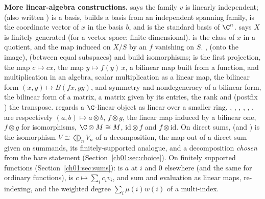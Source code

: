 \textbf{More linear-algebra constructions.}  says the family $v$ is
linearly independent;  (also written ) is a basis,  builds a basis from an independent spanning family,
 is the coordinate vector of $x$ in the basis $b$, and  is the
standard basis of $\C^n$.  says $X$ is finitely generated (for a vector space:
finite-dimensional).  is the class of $x$ in a quotient, and
 the map induced on $X/S$ by an $f$ vanishing on $S$. ,
 (onto the image),  (between equal subspaces) and
build isomorphisms;  is the first projection, 
the map $c\mapsto cx$,  the map $y\mapsto f(y)\,x$, 
a bilinear map built from a function,  and  multiplication
in an algebra,  scalar multiplication as a linear map,  the
bilinear form $(x,y)\mapsto B(fx,gy)$,  and  symmetry and
nondegeneracy of a bilinear form,  the bilinear form of a matrix,
 a matrix given by its entries,  the rank and  (postfix ) the transpose.
 regards a $\C$-linear object as linear over a smaller ring. ,
, , , ,
,  are
respectively $(a,b)\mapsto a\otimes b$, $f\otimes g$, the linear map induced by a bilinear one,
$f\otimes g$ for isomorphisms, $\C\otimes M\cong M$, $\mathrm{id}\otimes f$ and $f\otimes\mathrm{id}$.
On direct sums,  (and ) is the isomorphism
$V\cong\bigoplus_nV_n$ of a decomposition,  the map out of a direct sum given
on summands,  its finitely-supported analogue, and
 a decomposition \emph{chosen} from the bare statement
 (Section~\ref{ch01:sec:choice}). On finitely supported functions
(Section~\ref{ch01:sec:sums}):  is $a$ at $i$ and $0$ elsewhere (and
 the same for ordinary functions),  is
$c\mapsto\sum_ic_iv_i$,  and  sum and evaluation as linear
maps,  re-indexing, and  the weighted degree
$\sum_i\mu(i)w(i)$ of a multi-index.

